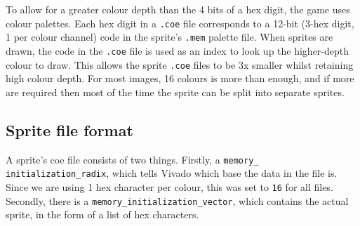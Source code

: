\documentclass{ifda}
\begin{document}
To allow for a greater colour depth than the 4 bits of a hex digit, the game uses colour palettes. Each hex digit in a \verb|.coe| file corresponds to a 12-bit (3-hex digit, 1 per colour channel) code in the sprite's \verb|.mem| palette file. When sprites are drawn, the code in the \verb|.coe| file is used as an index to look up the higher-depth colour to draw. This allows the sprite \verb|.coe| files to be 3x smaller whilst retaining high colour depth. For most images, 16 colours is more than enough, and if more are required then most of the time the sprite can be split into separate sprites.\\

\subsection{Sprite file format}
A sprite's coe file consists of two things. Firstly, a \verb|memory_|\\ \verb|initialization_radix|, which tells Vivado which base the data in the file is. Since we are using 1 hex character per colour, this was set to \verb|16| for all files. Secondly, there is a \verb|memory_initialization_vector|, which contains the actual sprite, in the form of a list of hex characters.\newpage
\end{document}

